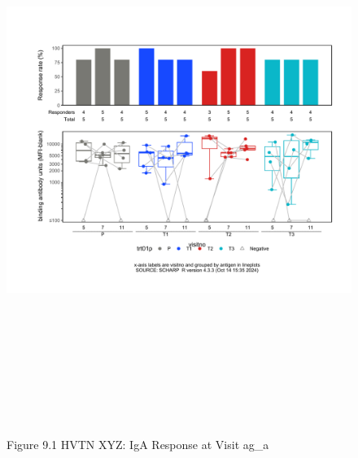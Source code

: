 \documentclass[12pt]{article}
\begin{document}
\begin{figure}[H]

{\centering \includegraphics[width=8.75in,height=7.25in]{test_cases_files/figure-latex/unnamed-chunk-18-1} 

}

\caption[Figure 9.1 lineplot (pos. response boxplots)]{Figure 9.1 HVTN XYZ: IgA Response at Visit ag\_a}\label{fig:unnamed-chunk-18}
\end{figure}
\clearpage
\end{document}
